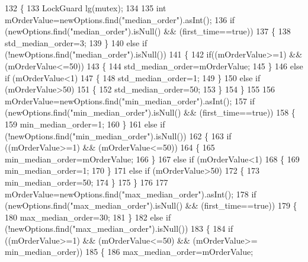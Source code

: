 \begin{DoxyCode}
132 \{
133     LockGuard lg(mutex);
134 
135     \textcolor{keywordtype}{int} mOrderValue=newOptions.find(\textcolor{stringliteral}{"median\_order"}).asInt();
136     \textcolor{keywordflow}{if} (newOptions.find(\textcolor{stringliteral}{"median\_order"}).isNull() && (first\_time==\textcolor{keyword}{true}))
137     \{
138         std_median_order=3;
139     \}
140     \textcolor{keywordflow}{else} \textcolor{keywordflow}{if} (!newOptions.find(\textcolor{stringliteral}{"median\_order"}).isNull())
141     \{
142         \textcolor{keywordflow}{if}((mOrderValue>=1) && (mOrderValue<=50))
143         \{
144             std_median_order=mOrderValue;
145         \}
146         \textcolor{keywordflow}{else} \textcolor{keywordflow}{if} (mOrderValue<1)
147         \{
148             std_median_order=1;
149         \}
150         \textcolor{keywordflow}{else} \textcolor{keywordflow}{if} (mOrderValue>50)
151         \{
152             std_median_order=50;
153         \}
154     \}
155 
156     mOrderValue=newOptions.find(\textcolor{stringliteral}{"min\_median\_order"}).asInt();
157     \textcolor{keywordflow}{if} (newOptions.find(\textcolor{stringliteral}{"min\_median\_order"}).isNull() && (first\_time==\textcolor{keyword}{true}))
158     \{
159         min_median_order=1;
160     \}
161     \textcolor{keywordflow}{else} \textcolor{keywordflow}{if} (!newOptions.find(\textcolor{stringliteral}{"min\_median\_order"}).isNull())
162     \{
163         \textcolor{keywordflow}{if} ((mOrderValue>=1) && (mOrderValue<=50))
164         \{
165             min_median_order=mOrderValue;
166         \}
167         \textcolor{keywordflow}{else} \textcolor{keywordflow}{if} (mOrderValue<1)
168         \{
169             min_median_order=1;
170         \}
171         \textcolor{keywordflow}{else} \textcolor{keywordflow}{if} (mOrderValue>50)
172         \{
173             min_median_order=50;
174         \}
175     \}
176 
177     mOrderValue=newOptions.find(\textcolor{stringliteral}{"max\_median\_order"}).asInt();
178     \textcolor{keywordflow}{if} (newOptions.find(\textcolor{stringliteral}{"max\_median\_order"}).isNull() && (first\_time==\textcolor{keyword}{true}))
179     \{
180         max_median_order=30;
181     \}
182     \textcolor{keywordflow}{else} \textcolor{keywordflow}{if} (!newOptions.find(\textcolor{stringliteral}{"max\_median\_order"}).isNull())
183     \{
184         \textcolor{keywordflow}{if} ((mOrderValue>=1) && (mOrderValue<=50) && (mOrderValue>=
      min_median_order))
185         \{
186             max_median_order=mOrderValue;

\end{DoxyCode}
